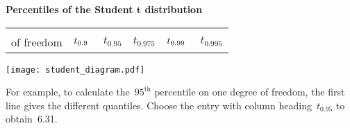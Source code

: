 \documentclass[a4paper]{article}
\begin{document}
\begin{center}
  {\Large\bf Percentiles of the Student $\mathbf{t}$ distribution}
\end{center}


\pagestyle{empty}
\thispagestyle{empty}
\centering
\begin{tabular}{r|ccccc}
  \begin{minipage}{20mm}degrees\\of freedom\end{minipage}
  & \begin{minipage}{1.3cm}\hfill{\Large $t_{0.9\hphantom{9}}$}\hfill\end{minipage}
  & \begin{minipage}{1.3cm}\hfill{\Large $t_{0.95}             $}\hfill\end{minipage}
  & \begin{minipage}{1.3cm}\hfill{\Large $t_{0.975}            $}\hfill\end{minipage}
  & \begin{minipage}{1.3cm}\hfill{\Large $t_{0.99\hphantom{9}} $}\hfill\end{minipage}
  & \begin{minipage}{1.3cm}\hfill{\Large $t_{0.995}            $}\hfill\end{minipage}
  \rule[-4mm]{0mm}{10mm}
  \\  \hline

  \hline
\end{tabular}

\begin{centering}
\texttt{[image: student\_diagram.pdf]}
\end{centering}

\noindent For example, to calculate the~$95^\mathrm{th}$ percentile on
one degree of freedom, the first line gives the different quantiles.
Choose the entry with column heading~$t_{0.95}$ to obtain~6.31.


\end{document}
